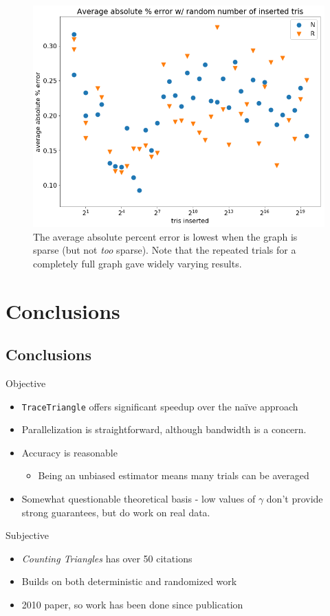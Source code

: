 \documentclass{beamer}
\begin{document}
\begin{frame}
    \begin{figure}
        \centering
        \includegraphics[width=0.7\linewidth]{figs/number-error.png}
        \caption{The average absolute percent error is lowest when the graph is sparse (but not \textit{too} sparse). Note that the repeated trials for a completely full graph gave widely varying results.}
        \label{fig:number-error}
    \end{figure}
\end{frame}

\section{Conclusions}

\subsection{Conclusions}

\begin{frame}
    Objective
    \begin{itemize}
        \item \texttt{TraceTriangle} offers significant speedup over the na\"ive approach
        \item Parallelization is straightforward, although bandwidth is a concern.
        \item Accuracy is reasonable
        \begin{itemize}
            \item Being an unbiased estimator means many trials can be averaged
        \end{itemize}
        \item Somewhat questionable theoretical basis - low values of $\gamma$ don't provide strong guarantees, but do work on real data.
    \end{itemize}
\end{frame}

\begin{frame}
    Subjective
    \begin{itemize}
        \item \textit{Counting Triangles} has over 50 citations
        \item Builds on both deterministic and randomized work
        \item 2010 paper, so work has been done since publication
    \end{itemize}
\end{frame}
\end{document}
